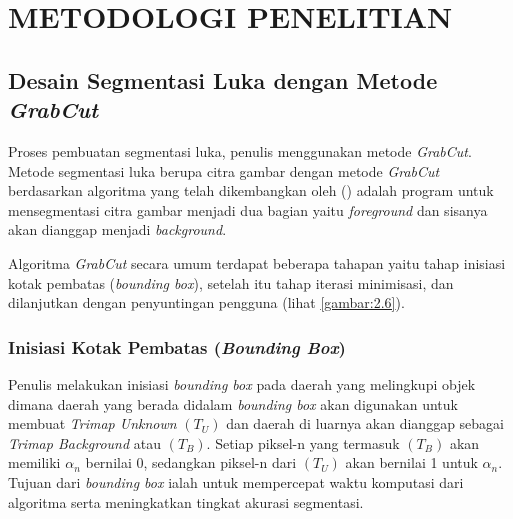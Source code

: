 
\chapter{METODOLOGI PENELITIAN}

\section{Desain Segmentasi Luka dengan Metode \emph{GrabCut}}
Proses pembuatan segmentasi luka, penulis menggunakan metode 
\emph{GrabCut}. Metode segmentasi luka berupa citra gambar dengan metode \emph{GrabCut} 
berdasarkan algoritma yang telah dikembangkan oleh (\cite{Rother:2004}) adalah program 
untuk mensegmentasi citra gambar menjadi dua bagian yaitu \emph{foreground} dan
sisanya akan dianggap menjadi \emph{background}. 

Algoritma \emph{GrabCut} secara umum terdapat beberapa tahapan yaitu tahap inisiasi
kotak pembatas (\emph{bounding box}), setelah itu tahap iterasi minimisasi, dan dilanjutkan
dengan penyuntingan pengguna (lihat \ref{gambar:2.6}).

\subsection{Inisiasi Kotak Pembatas (\emph{Bounding Box})}
Penulis melakukan inisiasi \emph{bounding box} pada daerah yang melingkupi objek 
dimana daerah yang berada didalam \emph{bounding box} akan digunakan untuk membuat 
\emph{Trimap Unknown} \((T_{U})\) dan daerah di luarnya akan dianggap sebagai \emph{Trimap Background} 
atau \((T_{B})\). Setiap piksel-n yang termasuk \((T_{B})\) akan memiliki \(\alpha_{n}\) 
bernilai 0, sedangkan piksel-n dari \((T_{U})\) akan bernilai 1 untuk \(\alpha_{n}\). 
Tujuan dari \emph{bounding box} ialah untuk mempercepat waktu komputasi dari 
algoritma serta meningkatkan tingkat akurasi segmentasi.

